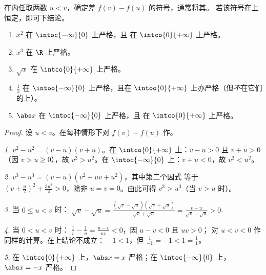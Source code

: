 \begin{method}[依定义证明变化]\label{met:g11:func:variation}
在内任取两数 $u < v$，确定差 $f(v) - f(u)$
的符号，通常将其\emph{}。
若该符号在上恒定，即可下结论。
\end{method}

\begin{proposition}[基本函数的变化]\label{prop:g11:func:refvariations}
\begin{enumerate}
  \item $x^2$ 在 $\intoc{-\infty}{0}$ 上严格，且
        在 $\intco{0}{+\infty}$ 上严格。
  \item $x^3$ 在 $\R$ 上严格。
  \item $\sqrt x$ 在 $\intco{0}{+\infty}$ 上严格。
  \item $\frac1x$ 在 $\intoo{-\infty}{0}$ 上严格，且在
        $\intoo{0}{+\infty}$ 上亦严格（但\emph{不}在它们的上）。
  \item $\abs x$ 在 $\intoc{-\infty}{0}$ 上严格，且
        在 $\intco{0}{+\infty}$ 上严格。
\end{enumerate}
\end{proposition}

\begin{proof}
设 $u < v$。在每种情形下对 $f(v) - f(u)$ 作。

\emph{1.} $v^2 - u^2 = (v-u)(v+u)$。在 $\intco{0}{+\infty}$ 上：$v - u > 0$
且 $v + u > 0$（因 $v > u \geq 0$），故 $v^2 > u^2$。在
$\intoc{-\infty}{0}$ 上：$v + u < 0$，故 $v^2 < u^2$。

\emph{2.} $v^3 - u^3 = (v - u)(v^2 + uv + u^2)$，其中第二个因式
等于 $\left(v + \frac u2\right)^2 + \frac{3u^2}{4} > 0$，除非
$u = v = 0$。由此可得 $v^3 > u^3$（当 $v > u$ 时）。

\emph{3.} 当 $0 \leq u < v$ 时：
$\sqrt v - \sqrt u = \frac{(\sqrt v - \sqrt u)(\sqrt v + \sqrt u)}
{\sqrt v + \sqrt u} = \frac{v - u}{\sqrt v + \sqrt u} > 0$.

\emph{4.} 当 $0 < u < v$ 时：
$\frac1v - \frac1u = \frac{u - v}{uv} < 0$，因 $u - v < 0$ 且 $uv > 0$；
对 $u < v < 0$ 作同样的计算。在上结论不成立：
$-1 < 1$，但 $\frac{1}{-1} = -1 < 1 = \frac11$。

\emph{5.} 在 $\intco{0}{+\infty}$ 上，$\abs x = x$ 严格；在
$\intoc{-\infty}{0}$ 上，$\abs x = -x$ 严格。
\end{proof}

